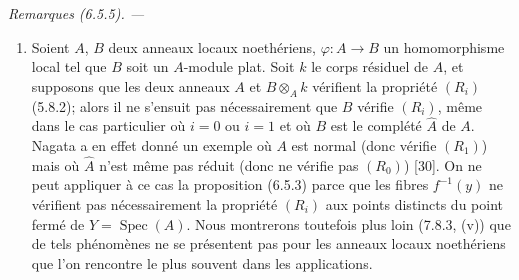 \documentclass[10pt,oneside]{book}
\makeatletter
\newenvironment{remarks}[1][]{%
  \par\medskip\noindent\itshape Remarques (#1). ---\ }{\par}
\newcommand{\EGAReaderTarget}[2]{\hypertarget{#1}{}\@bsphack\begingroup\def\@currentHref{#1}\label{#2}\endgroup\@esphack}
\makeatother
\begin{document}
\begin{remarks}[6.5.5]
\EGAReaderTarget{ega4.c04.item.6-5-5}{IV.2.s6.5.5-fr}
\medskip\noindent
\begin{enumerate}
\item[(i)] Soient $A$, $B$ deux anneaux locaux noethériens,
$\varphi:A\to B$ un homomorphisme local tel que $B$ soit un $A$-module
plat. Soit $k$ le corps résiduel de $A$, et supposons que les deux anneaux
$A$ et $B\otimes_Ak$ vérifient la propriété $(R_i)$ (5.8.2); alors il ne
s'ensuit pas nécessairement que $B$ vérifie $(R_i)$, même dans le cas
particulier où $i=0$ ou $i=1$ et où $B$ est le complété $\widehat A$ de
$A$. Nagata a en effet donné un exemple où $A$ est normal (donc vérifie
$(R_1)$) mais où $\widehat A$ n'est même pas réduit (donc ne vérifie pas
$(R_0)$) [30]. On ne peut appliquer à ce cas la proposition (6.5.3)
parce que les fibres $f^{-1}(y)$ ne vérifient pas nécessairement la
propriété $(R_i)$ aux points distincts du point fermé de $Y=\operatorname{Spec}(A)$.
Nous montrerons toutefois plus loin (7.8.3, (v)) que de tels phénomènes
ne se présentent pas pour les anneaux locaux noethériens que l'on rencontre
le plus souvent dans les applications.


\end{enumerate}
\end{remarks}
\end{document}
